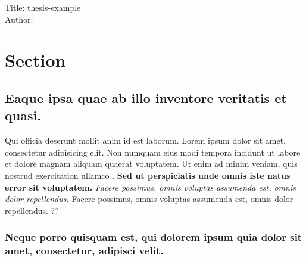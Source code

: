 \documentclass[]{report}
\date{}
\begin{document}
Title: thesis-example\\
Author:

\label{chapter-1}

\section{Section}\label{section-1.1}

\subsection{Eaque ipsa quae ab illo inventore veritatis et
quasi.}\label{eaque-ipsa-quae-ab-illo-inventore-veritatis-et-quasi.}

Qui officia deserunt mollit anim id est laborum. Lorem ipsum dolor sit
amet, consectetur adipisicing elit. Non numquam eius modi tempora
incidunt ut labore et dolore magnam aliquam quaerat voluptatem. Ut enim
ad minim veniam, quis nostrud exercitation ullamco
\citep{Zongkerchicken2005}. \textbf{Sed ut perspiciatis unde omnis iste
natus error sit voluptatem.} \emph{Facere possimus, omnis voluptas
assumenda est, omnis dolor repellendus.} Facere possimus, omnis voluptas
assumenda est, omnis dolor repellendus. ??\citep{upper1974unsuccessful}



\subsubsection{Neque porro quisquam est, qui dolorem ipsum quia dolor
sit amet, consectetur, adipisci
velit.}\label{neque-porro-quisquam-est-qui-dolorem-ipsum-quia-dolor-sit-amet-consectetur-adipisci-velit.}
\end{document}
